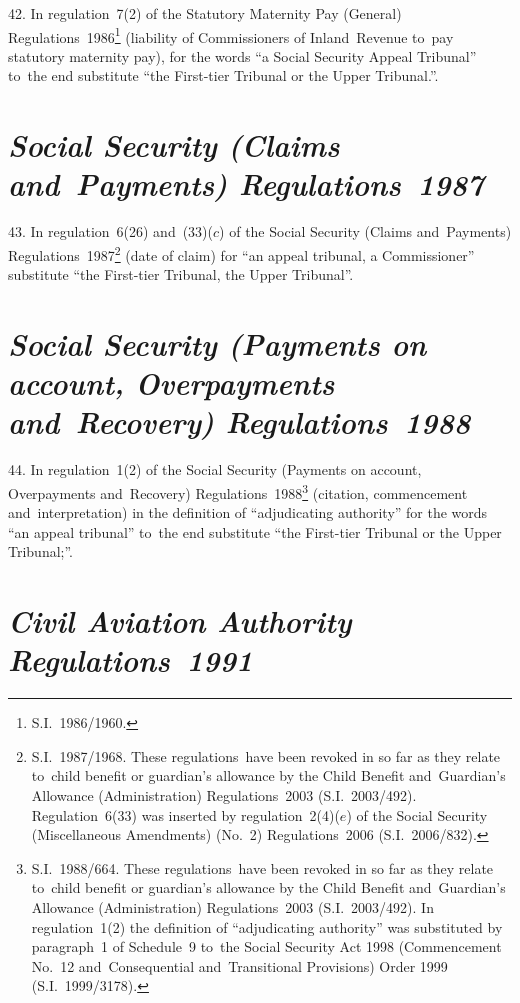 \documentclass[12pt,a4paper]{article}
\begin{document}
42.  In regulation~7(2) of the Statutory Maternity Pay (General) Regulations~1986\footnote{S.I.~1986/1960.} (liability of Commissioners of Inland~Revenue to~pay statutory maternity pay), for the words “a Social Security Appeal Tribunal” to~the end substitute “the First-tier Tribunal or the Upper Tribunal.”.

\enlargethispage{-4\baselineskip}

\section*{\itshape Social Security (Claims and~Payments) Regulations~1987}

43.  In regulation~6(26) and~(33)($c$)  of the Social Security (Claims and~Payments) Regulations~1987\footnote{S.I.~1987/1968. These regulations~have been revoked in so far as they relate to~child benefit or guardian’s allowance by the Child Benefit and~Guardian’s Allowance (Administration) Regulations~2003 (S.I.~2003/492). Regulation~6(33) was inserted by regulation~2(4)($e$) of the Social Security (Miscellaneous Amendments) (No.~2) Regulations~2006 (S.I.~2006/832).} (date of claim) for “an appeal tribunal, a Commissioner” substitute “the First-tier Tribunal, the Upper Tribunal”.

\section*{\itshape Social Security (Payments on account, Overpayments and~Recovery) Regulations~1988}

44.  In regulation~1(2) of the Social Security (Payments on account, Overpayments and~Recovery) Regulations~1988\footnote{S.I.~1988/664. These regulations~have been revoked in so far as they relate to~child benefit or guardian’s allowance by the Child Benefit and~Guardian’s Allowance (Administration) Regulations~2003 (S.I.~2003/492). In regulation~1(2) the definition of “adjudicating authority” was substituted by paragraph~1 of Schedule~9 to~the Social Security Act 1998 (Commencement No.~12 and~Consequential and~Transitional Provisions) Order 1999 (S.I.~1999/3178).} (citation, commencement and~interpretation) in the definition of “adjudicating authority” for the words “an appeal tribunal” to~the end substitute “the First-tier Tribunal or the Upper Tribunal;”.

\section*{\itshape Civil Aviation Authority Regulations~1991}
\end{document}
